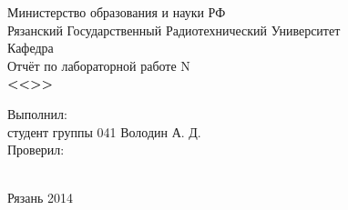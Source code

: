 \begin{titlepage}

\begin{center}
  Министерство образования и науки РФ \\
  Рязанский Государственный Радиотехнический Университет \\
  \vspace{0.2cm}
  Кафедра \\
  \vspace{18em}
  \Large Отчёт по лабораторной работе N  \\
  \textbf{<<>>} 
\end{center}

\vspace{14em}

\begin{flushright}
  Выполнил: \\ студент группы 041 Володин А. Д. \\
               
  \vspace{1.5em}
  Проверил: \\ \\ 
             
\end{flushright}

\vspace{\fill}

\begin{center}
  Рязань 2014
\end{center}

\end{titlepage}